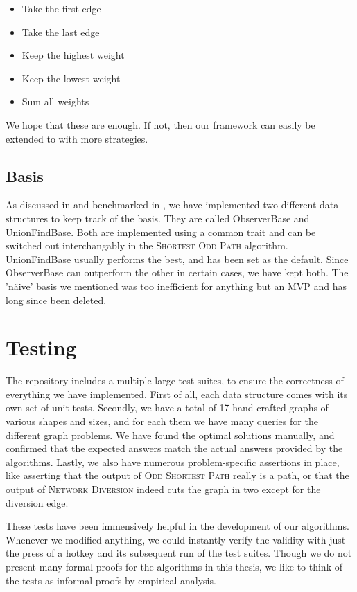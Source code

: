 \begin{itemize}
    \item Take the first edge
    \item Take the last edge
    \item Keep the highest weight
    \item Keep the lowest weight
    \item Sum all weights
\end{itemize}

We hope that these are enough. If not, then our framework can easily be extended to with more strategies.

\subsection{Basis}
As discussed in  and benchmarked in , we have implemented two different data structures to keep track of the basis. They are called ObserverBase and UnionFindBase. Both are implemented using a common trait and can be switched out interchangably in the \textsc{Shortest Odd Path} algorithm. UnionFindBase usually performs the best, and has been set as the default. Since ObserverBase can outperform the other in certain cases, we have kept both. The 'näive' basis we mentioned was too inefficient for anything but an MVP and has long since been deleted.

\section{Testing}
The repository includes a multiple large test suites, to ensure the correctness of everything we have implemented. First of all, each data structure comes with its own set of unit tests. Secondly, we have a total of 17 hand-crafted graphs of various shapes and sizes, and for each them we have many queries for the different graph problems. We have found the optimal solutions manually, and confirmed that the expected answers match the actual answers provided by the algorithms. Lastly, we also have numerous problem-specific assertions in place, like asserting that the output of \textsc{Odd Shortest Path} really is a path, or that the output of \textsc{Network Diversion} indeed cuts the graph in two except for the diversion edge.

These tests have been immensively helpful in the development of our algorithms. Whenever we modified anything, we could instantly verify the validity with just the press of a hotkey and its subsequent run of the test suites. Though we do not present many formal proofs for the algorithms in this thesis, we like to think of the tests as informal proofs by empirical analysis.

